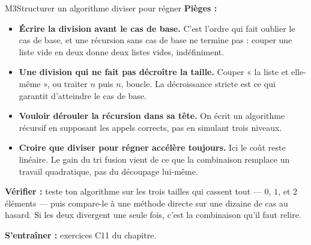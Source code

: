 \begin{fichemethode}{M3}{Structurer un algorithme diviser pour régner}
\textbf{Pièges :}
\begin{itemize}
  \item \textbf{Écrire la division avant le cas de base.} C'est l'ordre qui fait oublier le
    cas de base, et une récursion sans cas de base ne termine pas : couper une liste vide en
    deux donne deux listes vides, indéfiniment.
  \item \textbf{Une division qui ne fait pas décroître la taille.} Couper « la liste et
    elle-même », ou traiter $n$ puis $n$, boucle. La décroissance stricte est ce qui garantit
    d'atteindre le cas de base.
  \item \textbf{Vouloir dérouler la récursion dans sa tête.} On écrit un algorithme
    récursif en supposant les appels corrects, pas en simulant trois niveaux.
  \item \textbf{Croire que diviser pour régner accélère toujours.} Ici le coût reste linéaire.
    Le gain du tri fusion vient de ce que la combinaison remplace un travail quadratique, pas
    du découpage lui-même.
\end{itemize}

\textbf{Vérifier :} teste ton algorithme sur les trois tailles qui cassent tout — $0$, $1$, et
$2$ éléments — puis compare-le à une méthode directe sur une dizaine de cas au hasard. Si les
deux divergent une seule fois, c'est la combinaison qu'il faut relire.

\textbf{S'entraîner :} exercices C11 du chapitre.
\end{fichemethode}
